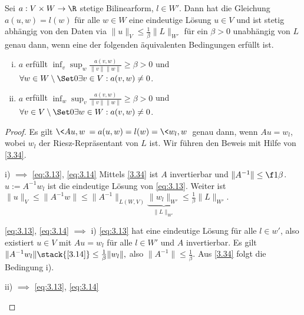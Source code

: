 \begin{st} \label{3.37}
	Sei $a: V \times W \to \R$ stetige Bilinearform, $l \in W'$.
	Dann hat die Gleichung
	\begin{math}[numbered] \label{eq:3.13}
		a(u,w) = l(w)
	\end{math}
	für alle $w \in W$ eine eindeutige Lösung $u \in V$ und ist stetig abhängig von den Daten via
	\begin{math}[numbered] \label{eq:3.14}
		\|u\|_V
		\le \frac{1}{\beta}\|L\|_{W'}
	\end{math}
	für ein $\beta > 0$ unabhängig von $L$ genau dann, wenn eine der folgenden äquivalenten Bedingungen erfüllt ist.
	\begin{enumerate}[i)]
		\item
			$a$ erfüllt $\inf_{v} \sup_{w} \frac{a(v,w)}{\|v\|\|w\|} \ge \beta > 0$ und $\forall w \in W \setminus \Set 0 \exists v \in V: a(v,w) \neq 0$.
		\item
			$a$ erfüllt $\inf_{w} \sup_{v} \frac{a(v,w)}{\|v\|\|w\|} \ge \beta > 0$ und $\forall v \in V \setminus \Set 0 \exists w \in W: a(v,w) \neq 0$.
	\end{enumerate}
	\begin{proof}
		Es gilt $\<Au,w\> = a(u,w) = l(w) = \<w_l, w\>$ genau dann, wenn $Au = w_l$, wobei $w_l$ der Riesz-Repräsentant von $L$ ist.
		Wir führen den Beweis mit Hilfe von \ref{3.34}.
		\begin{seg}{i) $\implies$ \eqref{eq:3.13}, \eqref{eq:3.14}}
			Mittels \ref{3.34} ist $A$ invertierbar und $\|A^{-1}\| \le \f 1\beta$.
			$u := A^{-1} w_l$ ist die eindeutige Lösung von \eqref{eq:3.13}.
			Weiter ist
			\begin{math}
				\|u\|_V
				\le \|A^{-1}w\|
				\le \|A^{-1}\|_{L(W,V)} \underbrace{\|w_l\|_{W'}}_{\|L\|_{W'}}
				\le \frac{1}{\beta}\|L\|_{W'}.
			\end{math}
		\end{seg}
		\begin{seg}{\eqref{eq:3.13}, \eqref{eq:3.14} $\implies$ i)}
			\eqref{eq:3.13} hat eine eindeutige Lösung für alle $l \in w'$, also existiert $u \in V$ mit $Au = w_l$ für alle $l \in W'$ und $A$ invertierbar.
			Es gilt
			\begin{math}
				\|A^{-1} w_l\|
				\stack{\eqref{3.14}}\le \frac{1}{\beta}\|w_l\|,
			\end{math}
			also $\|A^{-1}\| \le \frac{1}{\beta}$.
			Aus \ref{3.34} folgt die Bedingung i).
		\end{seg}
		\begin{seg}{ii) $\implies$ \eqref{eq:3.13}, \eqref{eq:3.14}}

\end{seg}
\end{proof}
\end{st}
